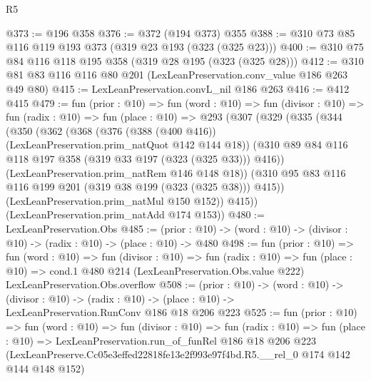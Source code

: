 \begin{lexlean}{R5}
\begin{coremodule}
@373 := @196 @358
@376 := @372 (@194 @373) @355
@388 := @310 @73 @85 @116 @119 @193 @373 (@319 @23 @193 (@323 (@325 @23)))
@400 := @310 @75 @84 @116 @118 @195 @358 (@319 @28 @195 (@323 (@325 @28)))
@412 := @310 @81 @83 @116 @116 @80 @201 (LexLeanPreservation.conv_value @186 @263 @49 @80)
@415 := LexLeanPreservation.convL_nil @186 @263
@416 := @412 @415
@479 := fun (prior : @10) =>
  fun (word : @10) =>
  fun (divisor : @10) =>
  fun (radix : @10) =>
  fun (place : @10) =>
  @293
    (@307
      (@329
        (@335
          (@344
            (@350
              (@362
                (@368
                  (@376 (@388 (@400 @416)) (LexLeanPreservation.prim_natQuot @142 @144 @18))
                  (@310 @89 @84 @116 @118 @197 @358 (@319 @33 @197 (@323 (@325 @33))) @416))
                (LexLeanPreservation.prim_natRem @146 @148 @18))
              (@310 @95 @83 @116 @116 @199 @201 (@319 @38 @199 (@323 (@325 @38))) @415))
            (LexLeanPreservation.prim_natMul @150 @152))
          @415))
      (LexLeanPreservation.prim_natAdd @174 @153))
@480 := LexLeanPreservation.Obs
@485 := (prior : @10) -> (word : @10) -> (divisor : @10) -> (radix : @10) -> (place : @10) -> @480
@498 := fun (prior : @10) =>
  fun (word : @10) =>
  fun (divisor : @10) =>
  fun (radix : @10) =>
  fun (place : @10) =>
  cond.{1} @480 @214 (LexLeanPreservation.Obs.value @222) LexLeanPreservation.Obs.overflow
@508 := (prior : @10) ->
  (word : @10) ->
  (divisor : @10) ->
  (radix : @10) -> (place : @10) -> LexLeanPreservation.RunConv @186 @18 @206 @223
@525 := fun (prior : @10) =>
  fun (word : @10) =>
  fun (divisor : @10) =>
  fun (radix : @10) =>
  fun (place : @10) =>
  LexLeanPreservation.run_of_funRel
    @186
    @18
    @206
    @223
    (LexLeanPreserve.Cc05e3effed22818fe13e2f993e97f4bd.R5.__rel_0 @174 @142 @144 @148 @152)
\end{coremodule}
\end{lexlean}
